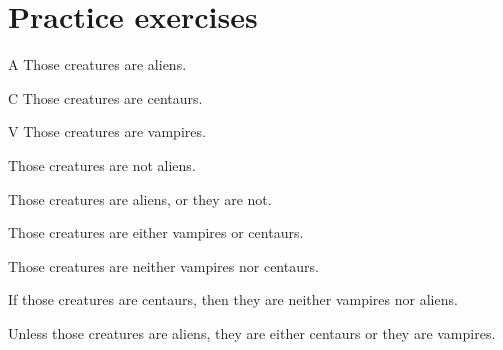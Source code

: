 




\section{Practice exercises}
\setcounter{ProbPart}{0}

\problempart 
	\begin{ekey}
		\item[A] Those creatures are aliens. 
		\item[C] Those creatures are centaurs. 
		\item[V] Those creatures are vampires.
	\end{ekey}
\begin{earg}
\item Those creatures are not aliens.
\item[] 
\item Those creatures are aliens, or they are not.
\item[]  
\item Those creatures are either vampires or centaurs.
\item[] 
\item Those creatures are neither vampires nor centaurs.
\item[] 
\item If those creatures are centaurs, then they are neither vampires nor aliens.
\item[] 
\item Unless those creatures are aliens, they are either centaurs or they are vampires.
\item[] 
\end{earg}


